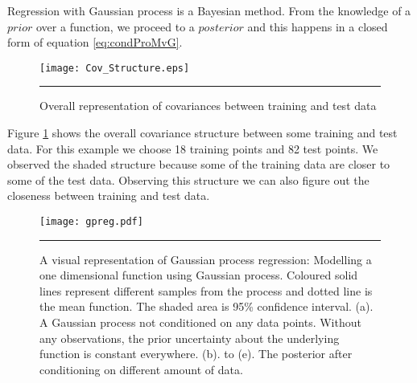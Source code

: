 Regression with Gaussian process is a Bayesian method. From the knowledge of a $prior$ over a function, we proceed to a $posterior$ and this happens in a closed form of equation \ref{eq:condProMvG}. 

\begin{figure}[t]
	\centering
		\texttt{[image: Cov\_Structure.eps]}
		\rule{35em}{0.5pt}
	\caption[Overall representation of covariances between training and test data]
		{Overall representation of covariances between training and test data}
	\label{fig:Covariances_Structure}
\end{figure}

Figure \ref{fig:Covariances_Structure} shows the overall covariance structure between some training and test data. For this example we choose 18 training points and 82 test points. We observed the shaded structure because some of the training data are closer to some of the test data. Observing this structure we can also figure out the closeness between training and test data. 

\begin{figure}
	\centering
		\texttt{[image: gpreg.pdf]}
		\rule{35em}{0.5pt}
	\caption[A visual representation of Gaussian process regression: Modelling a one dimensional function using Gaussian process]
		{A visual representation of Gaussian process regression: Modelling a one dimensional function using Gaussian process. Coloured solid lines represent different samples from the process and dotted line is the mean function. The shaded area is 95\% confidence interval. (a). A Gaussian process not conditioned on any data points. Without any observations, the prior uncertainty about the underlying function is constant everywhere. (b). to (e). The posterior after conditioning on different amount of data.}
	\label{fig:dempGPReg}
\end{figure}

